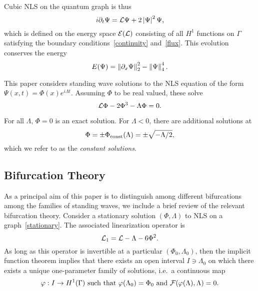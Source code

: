 \documentclass{article}
\numberwithin{equation}{section}
\numberwithin{figure}{section}
\begin{document}
Cubic NLS on the quantum graph is thus 
\begin{equation}
i \partial_t \Psi = \mathcal{L} \Psi  +2\left\lvert\Psi\right\rvert^2 \Psi,
\label{qNLS}
\end{equation}
which is defined on the energy space $\mathcal{E}(\mathcal{L})$ consisting of all $H^1$ functions on $\Gamma$ satisfying the boundary conditions~\eqref{continuity} and~\eqref{flux}. This evolution conserves the energy
\begin{equation*}
E(\Psi) = \left\lVert \partial_x \Psi \right\rVert_{2}^2 - \left\lVert \Psi \right\rVert_{4}^4.
\end{equation*}

This paper considers standing wave solutions to the NLS equation of the form $\Psi(x,t) = \Phi(x)e^{i \Lambda t}$. Assuming $\Phi$ to be real valued, these solve
\begin{equation}
\mathcal{L} \Phi - 2 \Phi^3 - \Lambda \Phi = 0.
\label{stationary}
\end{equation}



For all $\Lambda$, $\Phi=0$ is an exact solution. For $\Lambda<0$, there are additional solutions at 
\begin{equation}
\label{constantSolution}
\Phi = \pm \Phi_{\rm const}(\Lambda) = \pm \sqrt{-\Lambda/2},
\end{equation}
which we refer to as the \emph{constant solutions}.

\subsection{Bifurcation Theory}

As a principal aim of this paper is to distinguish among different bifurcations among the families of standing waves, we include a brief review of the relevant bifurcation theory. Consider a stationary solution $(\Phi,\Lambda)$ to NLS on a graph~\eqref{stationary}. The associated linearization operator is
\begin{equation}
\label{linearization}
\mathcal{L}_1 = \mathcal{L} - \Lambda - 6 \Phi^2.
\end{equation}
As long as this operator is invertible at a particular $(\Phi_0,\Lambda_0)$, then the implicit function theorem implies that there exists an open interval $I \ni \Lambda_0$  on which there exists a unique one-parameter family of solutions, i.e.\ a continuous map
$$
\varphi: I \to H^1(\Gamma) \text{ such that } \varphi(\Lambda_0)=\Phi_0 \text{ and } \mathcal{F}(\varphi(\Lambda),\Lambda) = 0.
$$  
\end{document}
